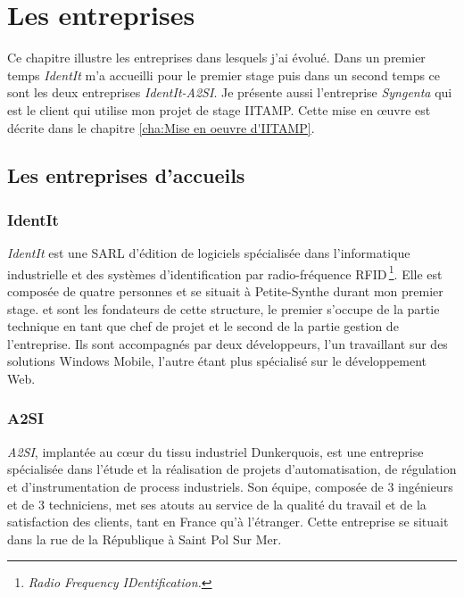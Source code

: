 \chapter{Les entreprises} %
\label{cha:Les entreprises}


\begin{it}

Ce chapitre illustre les entreprises dans lesquels j'ai évolué. Dans un
premier temps \emph{IdentIt} m'a accueilli pour le premier stage puis
dans un second temps ce sont les deux entreprises \emph{IdentIt-A2SI}. Je
présente aussi l'entreprise \emph{Syngenta} qui est le client qui
utilise mon projet de stage IITAMP. Cette mise en \oe{}uvre est décrite
dans le chapitre \ref{cha:Mise en oeuvre d'IITAMP}.

\end{it}

\section{Les entreprises d'accueils} %
\label{sec:Les entreprises d'accueils}

\subsection{IdentIt} %
\label{sub:IdentIt}

\emph{IdentIt} est une SARL d'édition de logiciels spécialisée dans
l'informatique industrielle et des systèmes d'identification par
radio-fréquence RFID\,\footnote{\emph{Radio Frequency IDentification.}}.
Elle est composée de quatre personnes et se situait à Petite-Synthe
durant mon premier stage.  et  sont les
fondateurs de cette structure, le premier s'occupe de la partie
technique en tant que chef de projet et le second de la partie gestion
de l'entreprise. Ils sont accompagnés par deux développeurs, l'un
travaillant sur des solutions Windows Mobile, l'autre étant plus
spécialisé sur le développement Web.


\subsection{A2SI} %
\label{sub:A2SI}

\emph{A2SI}, implantée au c\oe{}ur du tissu industriel Dunkerquois, est une
entreprise spécialisée dans l’étude et la réalisation de projets
d’automatisation, de régulation et d’instrumentation de process
industriels. Son équipe, composée de 3 ingénieurs et de 3
techniciens, met ses atouts au service de la qualité du travail et de la
satisfaction des clients, tant en France qu’à l’étranger. Cette
entreprise se situait dans la rue de la République à Saint Pol Sur Mer.

